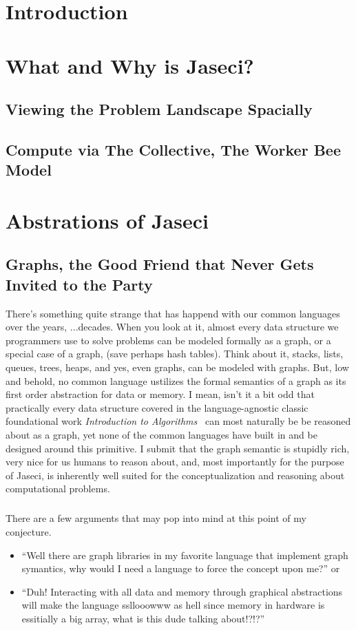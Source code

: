 \documentclass{book}
\begin{document}
\chapter{Introduction}


\chapter{What and Why is Jaseci?}
\section{Viewing the Problem Landscape Spacially}
\section{Compute via The Collective, The Worker Bee Model}

\chapter{Abstrations of Jaseci}
\section{Graphs, the Good Friend that Never Gets Invited to the Party}
There's something quite strange that has happend with our \gls{common languages} over the years, ...decades. When you look at it, almost every data structure we programmers use to solve problems can be modeled formally as a graph, or a special case of a graph, (save perhaps hash tables). Think about it, stacks, lists, queues, trees, heaps, and yes, even graphs, can be modeled with graphs. But, low and behold, no common language ustilizes the formal semantics of a graph as its first order abstraction for data or memory. I mean, isn't it a bit odd that practically every data structure covered in the language-agnostic classic foundational work \textit{Introduction to Algorithms}~\cite{intro_to_algo} can most naturally be be reasoned about as a graph, yet none of the common languages have built in and be designed around this primitive. I submit that the graph semantic is stupidly rich, very nice for us humans to reason about, and, most importantly for the purpose of Jaseci, is inherently well suited for the conceptualization and reasoning about computational problems.
\paragraph{}
There are a few arguments that may pop into mind at this point of my conjecture.
\begin{itemize}
    \item ``Well there are graph libraries in my favorite language that implement graph symantics, why would I need a language to force the concept upon me?''
          or
    \item ``Duh! Interacting with all data and memory through graphical abstractions will make the language ssllooowww as hell since memory in hardware is essitially a big array, what is this dude talking about!?!?''
\end{itemize}
\end{document}
